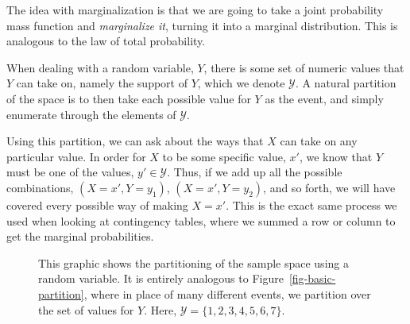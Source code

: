 \documentclass[
  letterpaper,
  DIV=11,
  numbers=noendperiod]{scrreprt}
\theoremstyle{definition}
\theoremstyle{definition}
\theoremstyle{definition}
\theoremstyle{remark}
\begin{document}
\begin{tcolorbox}[enhanced jigsaw, coltitle=black, colframe=quarto-callout-tip-color-frame, colbacktitle=quarto-callout-tip-color!10!white, bottomrule=.15mm, opacitybacktitle=0.6, colback=white, toptitle=1mm, arc=.35mm, leftrule=.75mm, bottomtitle=1mm, opacityback=0, breakable, rightrule=.15mm, title={Marginalization}, left=2mm, titlerule=0mm, toprule=.15mm]

The idea with marginalization is that we are going to take a joint
probability mass function and \emph{marginalize it}, turning it into a
marginal distribution. This is analogous to the law of total
probability.

When dealing with a random variable, \(Y\), there is some set of numeric
values that \(Y\) can take on, namely the support of \(Y\), which we
denote \(\mathcal{Y}\). A natural partition of the space is to then take
each possible value for \(Y\) as the event, and simply enumerate through
the elements of \(\mathcal{Y}\).

Using this partition, we can ask about the ways that \(X\) can take on
any particular value. In order for \(X\) to be some specific value,
\(x'\), we know that \(Y\) must be one of the values,
\(y'\in\mathcal{Y}\). Thus, if we add up all the possible combinations,
\((X=x',Y=y_1)\), \((X=x',Y=y_2)\), and so forth, we will have covered
every possible way of making \(X=x'\). This is the exact same process we
used when looking at contingency tables, where we summed a row or column
to get the marginal probabilities.

\begin{figure}[H]

\caption{\label{fig-basic-partition-rv}This graphic shows the
partitioning of the sample space using a random variable. It is entirely
analogous to Figure~\ref{fig-basic-partition}, where in place of many
different events, we partition over the set of values for \(Y\). Here,
\(\mathcal{Y} = \{1,2,3,4,5,6,7\}\).}

\end{figure}
\end{tcolorbox}
\end{document}
